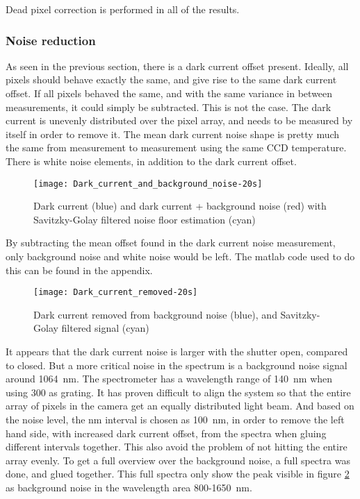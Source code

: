Dead pixel correction is performed in all of the results.

\subsubsection{Noise reduction}

As seen in the previous section, there is a dark current offset present. Ideally, all pixels should behave exactly the same, and give rise to the same dark current offset. If all pixels behaved the same, and with the same variance in between measurements, it could simply be subtracted. This is not the case. The dark current is unevenly distributed over the pixel array, and needs to be measured by itself in order to remove it. The mean dark current noise shape is pretty much the same from measurement to measurement using the same CCD temperature. There is white noise elements, in addition to the dark current offset. 

\begin{figure}[H]
\centering
\texttt{[image: Dark\_current\_and\_background\_noise-20s]}
\caption[Dark current and noise]{Dark current (blue) and dark current + background noise (red) with Savitzky-Golay filtered noise floor estimation (cyan)}%
\label{fig:dark_current_and_background_noise}%
\end{figure}

By subtracting the mean offset found in the dark current noise measurement, only background noise and white noise would be left. The matlab code used to do this can be found in the appendix.

\begin{figure}[H]
\centering
\texttt{[image: Dark\_current\_removed-20s]}
\caption[Dark current removed]{Dark current removed from background noise (blue), and Savitzky-Golay filtered signal (cyan)}%
\label{fig:dark_current_removed-20s}%
\end{figure}

It appears that the dark current noise is larger with the shutter open, compared to closed. But a more critical noise in the spectrum is a background noise signal around 1064~nm. The spectrometer has a wavelength range of 140~nm when using 300 as grating. It has proven difficult to align the system so that the entire array of pixels in the camera get an equally distributed light beam. And based on the noise level, the nm interval is chosen as 100~nm, in order to remove the left hand side, with increased dark current offset, from the spectra when gluing different intervals together. This also avoid the problem of not hitting the entire array evenly. To get a full overview over the background noise, a full spectra was done, and glued together. This full spectra only show the peak visible in figure \ref{fig:dark_current_removed-20s} as background noise in the wavelength area 800-1650~nm.

